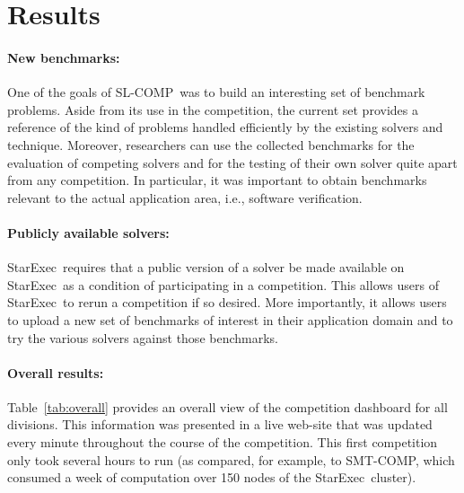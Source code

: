 \documentclass[twoside,11pt]{article}
\newcommand{\SLEEK}{\textsc{Sleek}}
\newcommand{\smtcomp}{\textsf{SMT-COMP}}
\newcommand{\slcomp}{\textsf{SL-COMP}}
\newcommand{\starexec}{\textsf{StarExec}}
\begin{document}
\section{Results}

\paragraph{New benchmarks:}
One of the goals of \slcomp\ was to build an interesting set of benchmark problems. 
Aside from its use in the competition, the current set provides a reference of the kind of problems handled efficiently by the existing solvers and technique.
Moreover, researchers can use the collected benchmarks for the evaluation of competing solvers and for the testing of their own solver quite apart from any competition. 
In particular, it was important to obtain benchmarks relevant to the actual application area, i.e., software verification.


\paragraph{Publicly available solvers:} \starexec\ requires that a public version of a solver be made available on \starexec\ as a condition of participating in a competition. This allows users of \starexec\ to rerun a competition if so desired. More importantly, it allows users to upload a new set of benchmarks of interest in their application domain and to try the various solvers against those benchmarks.

\paragraph{Overall results:}
Table~\ref{tab:overall} provides an overall view of the competition dashboard for all divisions. This information was presented in a live web-site that was updated every minute throughout the course of the competition. This first competition only took several hours to run (as compared, for example, to \smtcomp, which consumed a week of computation over 150 nodes of the \starexec\ cluster).
 
\end{document}
